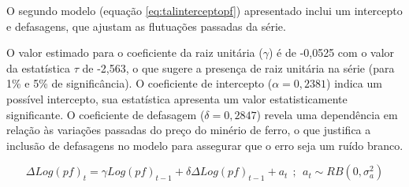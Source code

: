 \documentclass[a4paper,12pt]{article}[abntex2]
\begin{document}
O segundo modelo (equação \ref{eq:talinterceptopf}) apresentado inclui um intercepto e defasagens, que ajustam as flutuações passadas da série.

O valor estimado para o coeficiente da raiz unitária ($\gamma$) é de -0,0525 com o valor da estatística $\tau$ de -2,563, o que sugere a presença de raiz unitária na série (para 1\% e 5\% de significância). O coeficiente de intercepto ($\alpha = 0,2381$) indica um possível intercepto, sua estatística apresenta um valor estatisticamente significante. O coeficiente de defasagem ($\delta = 0,2847$) revela uma dependência em relação às variações passadas do preço do minério de ferro, o que justifica a inclusão de defasagens no modelo para assegurar que o erro seja um ruído branco.

\begin{equation}
    \Delta Log(pf)_t = \gamma Log(pf)_{t-1} + \delta \Delta Log(pf)_{t-1} + a_t \ \ ; \ \ a_t \sim RB(0, \sigma_a^2)   
    \label{eq:tallpf}
\end{equation}
\end{document}
